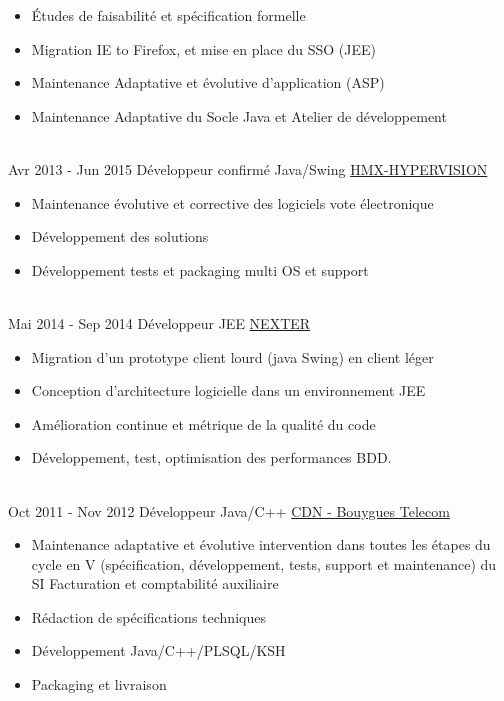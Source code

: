 \documentclass[letterpaper]{twentysecondcv} %
\begin{document}
\begin{twenty}
{{\begin{itemize}
		\item Études de faisabilité et spécification formelle
		\item Migration IE to Firefox, et mise en place du SSO (JEE)
		\item Maintenance Adaptative et évolutive d'application (ASP)
		\item Maintenance Adaptative du Socle Java et Atelier de développement
    	\end{itemize}}
        }
     \\
     \twentyitem
   		{Avr 2013 -}
		{Jun 2015}
        {Développeur confirmé Java/Swing}
        {\href{}{HMX-HYPERVISION}}
        {}
        {
        \begin{itemize}
        \item Maintenance évolutive et corrective des logiciels vote électronique
        \item Développement des solutions
        \item Développement tests et packaging multi OS et support
    	\end{itemize}
    	}
	\\   
		\twentyitem
		{Mai 2014 -}
		{Sep 2014}
		{Développeur JEE}
		{\href{https://www.nexter-group.fr/}{NEXTER}}
		{}
		{
		\begin{itemize}
		\item Migration d'un prototype client lourd (java Swing) en client léger
		\item Conception d'architecture logicielle dans un environnement JEE
		\item Amélioration continue et métrique de la qualité du code
		\item Développement, test, optimisation des performances BDD.
		\end{itemize}
		}       
       \\
	    \twentyitem
	    {Oct 2011 -}
	    {Nov 2012}
	    {Développeur Java/C++}
	    {\href{https://www.jobs.bouyguestelecom.fr/}{CDN - Bouygues Telecom}}
	    {}
	    {
	    \begin{itemize}
	    \item Maintenance adaptative et évolutive intervention dans toutes les étapes du cycle en V (spécification, développement, tests, support et maintenance) du SI Facturation et comptabilité auxiliaire
	    \item Rédaction de spécifications techniques
	    \item Développement Java/C++/PLSQL/KSH
	    \item Packaging et livraison	
	    \end{itemize}
	    }
    

\end{twenty}
\end{document}

